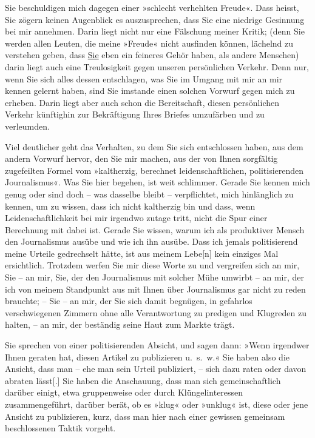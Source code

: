 \pstart
           Sie beschuldigen mich dagegen einer »schlecht verhehlten Freude«. Dass heisst, Sie
               zögern keinen Augenblick es auszu{\pb}sprechen, dass Sie eine
               niedrige Gesinnung bei mir annehmen. Darin liegt nicht nur eine Fälschung meiner
               Kritik; (denn Sie werden allen Leuten, die meine »Freude« nicht ausfinden können,
               lächelnd zu verstehen geben, dass \uline{Sie} eben ein
               feineres Gehör haben, als andere Menschen) darin liegt auch eine Treulosigkeit gegen
               unseren persönlichen Verkehr. Denn nur, wenn Sie sich alles dessen entschlagen, was
               Sie im Umgang mit mir an mir kennen gelernt haben, sind Sie imstande einen solchen
               Vorwurf gegen mich zu erheben. Darin liegt aber auch schon die Bereitschaft, diesen
               persönlichen Verkehr künftighin zur Bekräftigung Ihres Briefes umzufärben und zu
               verleumden.\pend
           
\pstart
           Viel deutlicher geht das Verhalten, zu dem Sie sich entschlossen haben, aus dem
               andern Vorwurf hervor, den Sie mir machen, aus der von Ihnen sorgfältig zugefeilten
               Formel vom »kaltherzig, berechnet leidenschaftlichen, politisierenden Journalismus«.
               Was Sie hier begehen, ist weit schlimmer. Gerade Sie kennen mich genug oder sind doch
               – was dasselbe bleibt – verpflichtet, mich hinlänglich zu kennen, um zu wissen, dass
               ich nicht kaltherzig bin und dass, wenn Leidenschaftlichkeit bei mir irgendwo zutage
               tritt, nicht die Spur einer Berechnung mit dabei ist. Gerade Sie wissen, warum ich
               als produktiver Mensch den Journalismus ausübe und wie ich ihn ausübe. Dass ich
               jemals politisierend meine Urteile gedrechselt hätte, ist aus meinem
                  Lebe{[}n{]} kein einziges Mal ersichtlich. Trotzdem werfen Sie mir
               diese Worte zu und vergreifen sich an mir, Sie – an mir, Sie, der den Journalismus
               mit solcher Mühe umwirbt – an mir, der ich von meinem Standpunkt aus mit Ihnen über
               Journalismus gar nicht zu reden brauchte; – Sie – an mir, der Sie sich damit
               begnügen, in gefahrlos verschwiegenen Zimmern ohne alle Verantwortung zu pre{\pb}digen und Klugreden zu halten, –
               an mir, der beständig seine Haut zum Markte trägt.\pend
           
\pstart
           Sie sprechen von einer politisierenden Absicht, und sagen dann: »Wenn irgendwer Ihnen
               geraten hat, diesen Artikel zu publizieren u. s. w.« Sie haben also die Ansicht, dass
               man – ehe man sein Urteil publiziert, – sich dazu raten oder davon abraten
                  lässt{[}.{]} Sie haben die Anschauung, dass man sich
               gemeinschaftlich darüber einigt, etwa gruppenweise oder durch Klüngelinteressen
               zusammengeführt, darüber berät, ob es »klug« oder »unklug« ist, diese oder jene
               Ansicht zu publizieren, kurz, dass man hier nach einer gewissen gemeinsam
               beschlossenen Taktik vorgeht.\pend
           

